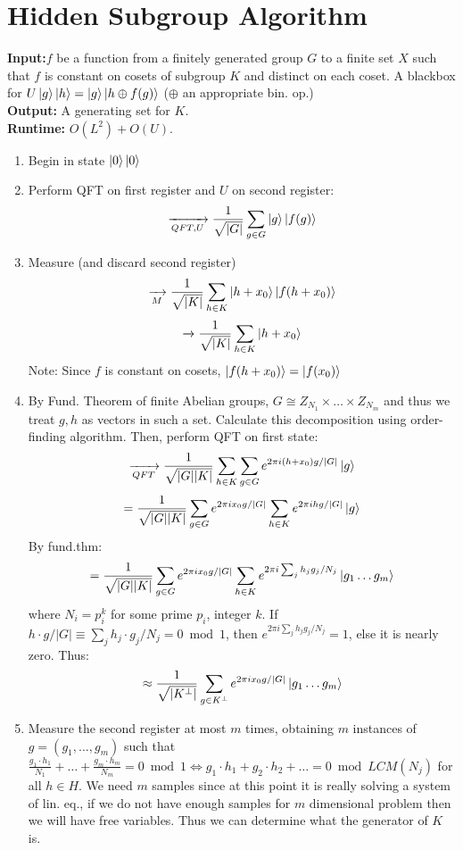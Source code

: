 \documentclass{article}
\begin{document}
\section*{Hidden Subgroup Algorithm}
\textbf{Input:}$f$ be a function from a finitely generated group $G$ to a finite set $X$ such that $f$ is constant on cosets of subgroup $K$ and distinct on each coset. A blackbox for $U\ket{g}\ket{h} = \ket{g}\ket{h \oplus f(g)}$ ($\oplus$ an appropriate bin. op.)\\
\textbf{Output:} A generating set for $K$.\\
\textbf{Runtime:} $O(L^2) + O(U)$.
\begin{enumerate}
	\item Begin in state $\ket{0}\ket{0}$ 
	\item Perform QFT on first register and $U$ on second register:
		$$\xrightarrow[QFT,U]{} \frac{1}{\sqrt{|G|}}\sum_{g \in G} \ket{g} \ket{f(g)}$$
	\item Measure (and discard second register)
		$$\xrightarrow[M]{} \frac{1}{\sqrt{|K|}} \sum_{h \in K} \ket{h + x_0} \ket{f(h+x_0)}$$
		$$\xrightarrow[]{} \frac{1}{\sqrt{|K|}}\sum_{h \in K} \ket{h + x_0}$$
		Note: Since $f$ is constant on cosets, $\ket{f(h+x_0)} = \ket{f(x_0)}$
	\item By Fund. Theorem of finite Abelian groups, $G\cong Z_{N_1} \times \dots \times Z_{N_m}$ and thus we treat $g,h$ as vectors in such a set. Calculate this decomposition using order-finding algorithm. Then, perform QFT on first state:
		$$\xrightarrow[QFT]{} \frac{1}{\sqrt{|G||K|}} \sum_{h \in K} \sum_{g \in G} e^{2\pi i (h+x_0)g/|G|} \ket{g} $$
		$$=\frac{1}{\sqrt{|G||K|}} \sum_{g \in G} e^{2\pi i x_0 g/ |G|}\sum_{h \in K} e^{2\pi i h g/ |G|} \ket{g}$$
		By fund.thm:
		$$=\frac{1}{\sqrt{|G||K|}} \sum_{g\in G}e^{2\pi i x_0 g/|G|} \sum_{h \in K} e^{2\pi i \sum_j h_j g_j/ N_j} \ket{g_1\dots g_m}$$
			where $N_i = p_i^k$ for some prime $p_i$, integer $k$.
			If $h\cdot g/|G| \equiv \sum_j h_j \cdot g_j / N_j = 0 \bmod {1}$, then $ e^{2\pi i \sum_j h_j g_j/ N_j} = 1$, else it is nearly zero. Thus:
			$$\approx \frac{1}{\sqrt{|K^\perp|}} \sum_{g \in K^\perp} e^{2\pi i x_0 g/|G|} \ket{g_1 \dots g_m}$$
	\item Measure the second register at most $m$ times, obtaining $m$ instances of $g= (g_1, \dots, g_m)$ such that $\frac{g_1 \cdot h_1}{N_1} + \dots + \frac{g_m \cdot h_m}{N_m}  = 0 \bmod {1} \iff g_1 \cdot h_1 + g_2 \cdot h_2 + \dots = 0 \bmod LCM(N_j) $ for all $h \in H$. We need $m$ samples since at this point it is really solving a system of lin. eq., if we do not have enough samples for $m$ dimensional problem then we will have free variables. Thus we can determine what the generator of $K$ is. 
\end{enumerate}
\end{document}
